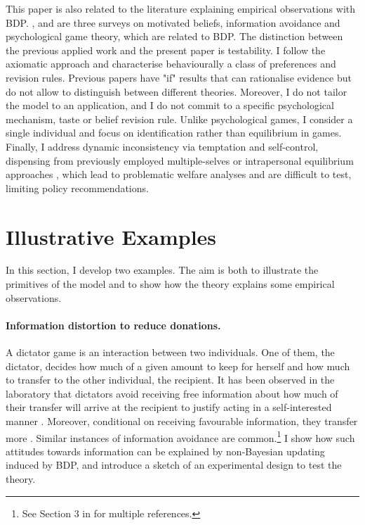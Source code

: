 This paper is also related to the literature explaining empirical observations with BDP. \cite{benabou2016mindful}, \cite{golmanInformationAvoidance2017} and \cite{battigalliBeliefdependentMotivationsPsychological2022} are three surveys on motivated beliefs, information avoidance and psychological game theory, which are related to BDP. The distinction between the previous applied work and the present paper is testability. I follow the axiomatic approach and characterise behaviourally a class of preferences and revision rules. Previous papers have "if" results that can rationalise evidence but do not allow to distinguish between different theories. Moreover, I do not tailor the model to an application, and I do not commit to a specific psychological mechanism, taste or belief revision rule. Unlike psychological games, I consider a single individual and focus on identification rather than equilibrium in games. Finally, I address dynamic inconsistency via temptation and self-control, dispensing from previously employed multiple-selves or intrapersonal equilibrium approaches \citep{brunnermeierOptimalExpectations2005,koszegiUtilityAnticipationPersonal2010}, which lead to problematic welfare analyses \citep[p. 404]{siniscalchiDynamicChoiceAmbiguity2011} and are difficult to test, limiting policy recommendations.

\section{Illustrative Examples}\label{sec:example}

In this section, I develop two examples. The aim is both to illustrate the primitives of the model and to show how the theory explains some empirical observations.

\paragraph{Information distortion to reduce donations.} A dictator game is an interaction between two individuals. One of them, the dictator, decides how much of a given amount to keep for herself and how much to transfer to the other individual, the recipient. It has been observed in the laboratory that dictators avoid receiving free information about how much of their transfer will arrive at the recipient to justify acting in a self-interested manner \citep{danaExploitingMoralWiggle2007}. Moreover, conditional on receiving favourable information, they transfer more \citep{grossmanSelfimageStrategicIgnorance2013,vanderweeleInconvenientTruthsDeterminants2014}. Similar instances of information avoidance are common.\footnote{See Section 3 in \cite{golmanInformationAvoidance2017} for multiple references.} I show how such attitudes towards information can be explained by non-Bayesian updating induced by BDP, and introduce a sketch of an experimental design to test the theory.

